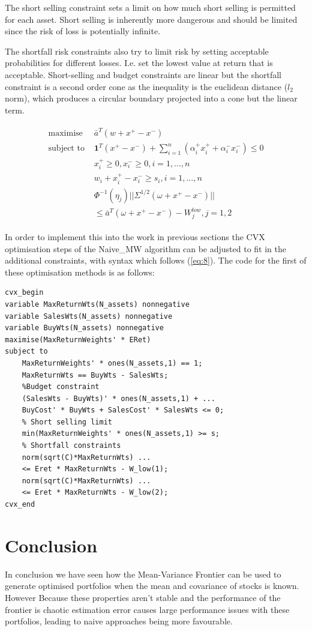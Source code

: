 \documentclass[a4paper,10pt, twocolumn]{article}
\begin{document}
The short selling constraint sets a limit on how much short selling is permitted for each asset. Short selling is inherently more dangerous and should be limited since the risk of loss is potentially infinite. 

The shortfall risk constraints also try to limit risk by setting acceptable probabilities for different losses. I.e. set the lowest value at return that is acceptable. Short-selling and budget constraints are linear but the shortfall constraint is a second order cone as the inequality is the euclidean distance ($l_2$ norm), which produces a circular boundary projected into a cone but the linear term.      

\begin{align}
\begin{split}
\text{maximise  } &\bar{a}^T(w+x^+-x^-) \\
\text{subject to  } &\mathbf{1}^T(x^+-x^-)+ \sum^n_{i=1}(\alpha_i^+x_i^++\alpha^-_ix^-_i) \leq 0 \\
&x_i^+ \geq 0, x_i^- \geq 0, i = 1,...,n \\
&w_i+x_i^+ - x_i^- \geq s_i, i = 1,...,n \\
& \Phi^{-1}(\eta_j)||\Sigma^{1/2}(\omega+x^+-x^-)|| \\ \: &\leq \bar{a}^T(\omega+x^+-x^-) - W_j^{low}, j = 1,2
\end{split}
\label{eq:8}
\end{align}

In order to implement this into the work in previous sections the CVX optimisation steps of the Naive\_MW algorithm can be adjusted to fit in the additional constraints, with syntax which follows (\ref{eq:8}). The code for the first of these optimisation methods is as follows:
\begin{lstlisting} 
cvx_begin
variable MaxReturnWts(N_assets) nonnegative
variable SalesWts(N_assets) nonnegative
variable BuyWts(N_assets) nonnegative
maximise(MaxReturnWeights' * ERet)
subject to
	MaxReturnWeights' * ones(N_assets,1) == 1;
	MaxReturnWts == BuyWts - SalesWts;        
	%Budget constraint    
    (SalesWts - BuyWts)' * ones(N_assets,1) + ...
    BuyCost' * BuyWts + SalesCost' * SalesWts <= 0;
	% Short selling limit    
    min(MaxReturnWeights' * ones(N_assets,1) >= s;
	% Shortfall constraints	
	norm(sqrt(C)*MaxReturnWts) ...
	<= Eret * MaxReturnWts - W_low(1);
	norm(sqrt(C)*MaxReturnWts) ...
	<= Eret * MaxReturnWts - W_low(2);     
cvx_end
\end{lstlisting} 
\section{Conclusion}
In conclusion we have seen how the Mean-Variance Frontier can be used to generate optimised portfolios when the mean and covariance of stocks is known. However Because these properties aren't stable and the performance of the frontier is chaotic estimation error causes large performance issues with these portfolios, leading to naive approaches being more favourable. 
\end{document}
